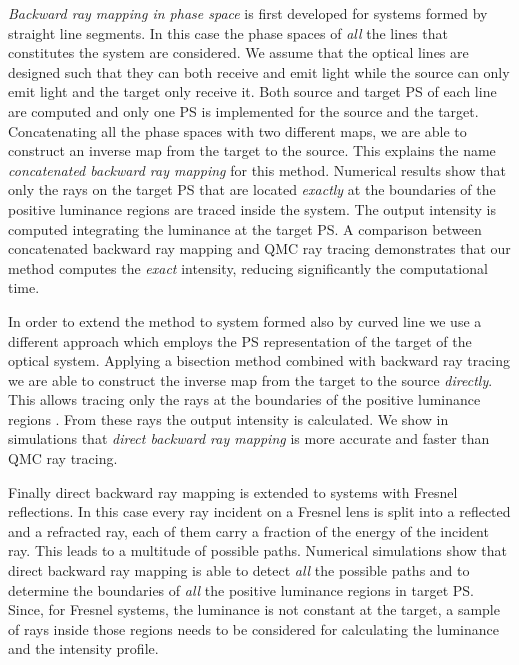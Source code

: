 \textit{Backward ray mapping in phase space} is first developed for systems formed by straight line segments. In this case the phase spaces of \textit{all} the lines that constitutes the system are considered. We assume that the optical lines are designed such that they can both receive and emit light while the source can only emit light and the target only receive it. Both source and target PS of each line are computed and only one PS is implemented for the source and the target. Concatenating all the phase spaces with two different maps, we are able to construct an inverse map from the target to the source. This explains the name \textit{concatenated backward ray mapping} for this method. Numerical results show that only the rays on the target PS that are located \textit{exactly} at the boundaries of the positive luminance regions are traced inside the system. The output intensity is computed integrating the luminance at the target PS. A comparison between concatenated backward ray mapping and QMC ray tracing demonstrates that our method computes the \textit{exact} intensity, reducing significantly the computational time. 

In order to extend the method to system formed also by curved line we use a different approach which employs the PS representation of the target of the optical system. Applying a bisection method combined with backward ray tracing we are able to construct the inverse map from the target to the source \textit{directly}. This allows tracing only the rays at the boundaries of the positive luminance regions \cite{filosa2017inverse}. From these rays the output intensity is calculated. We show in simulations that \textit{direct backward ray mapping} is more accurate and faster than QMC ray tracing.

Finally direct backward ray mapping is extended to systems with Fresnel reflections. In this case every ray incident on a Fresnel lens is split into a reflected and a refracted ray, each of them carry a fraction of the energy of the incident ray. This leads to a multitude of possible paths. 
Numerical simulations show that direct backward ray mapping is able to detect \textit{all} the possible paths and to determine the boundaries of \textit{all} the positive luminance regions in target PS. Since, for Fresnel systems, the luminance is not constant at the target, a sample of rays inside those regions needs to be considered for calculating the luminance and the intensity profile.

